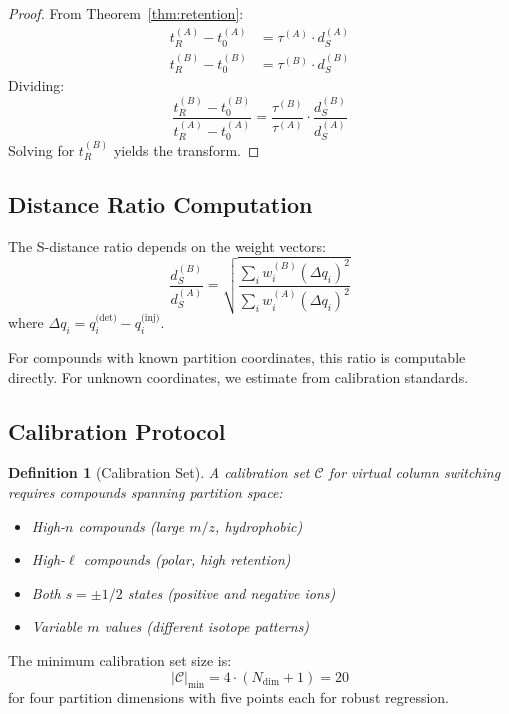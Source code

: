 \documentclass[twocolumn,10pt]{article}
\newtheorem{definition}[theorem]{Definition}
\begin{document}
\begin{proof}
From Theorem~\ref{thm:retention}:
\begin{align}
t_R^{(A)} - t_0^{(A)} &= \tau^{(A)} \cdot d_S^{(A)} \\
t_R^{(B)} - t_0^{(B)} &= \tau^{(B)} \cdot d_S^{(B)}
\end{align}
Dividing:
\begin{equation}
\frac{t_R^{(B)} - t_0^{(B)}}{t_R^{(A)} - t_0^{(A)}} = \frac{\tau^{(B)}}{\tau^{(A)}} \cdot \frac{d_S^{(B)}}{d_S^{(A)}}
\end{equation}
Solving for $t_R^{(B)}$ yields the transform.
\end{proof}

\subsection{Distance Ratio Computation}

The S-distance ratio depends on the weight vectors:
\begin{equation}
\frac{d_S^{(B)}}{d_S^{(A)}} = \sqrt{\frac{\sum_i w_i^{(B)} (\Delta q_i)^2}{\sum_i w_i^{(A)} (\Delta q_i)^2}}
\end{equation}
where $\Delta q_i = q_i^{\text{(det)}} - q_i^{\text{(inj)}}$.

For compounds with known partition coordinates, this ratio is computable directly. For unknown coordinates, we estimate from calibration standards.

\subsection{Calibration Protocol}

\begin{definition}[Calibration Set]
\label{def:calibration}
A calibration set $\mathcal{C}$ for virtual column switching requires compounds spanning partition space:
\begin{itemize}
    \item High-$n$ compounds (large $m/z$, hydrophobic)
    \item High-$\ell$ compounds (polar, high retention)
    \item Both $s = \pm 1/2$ states (positive and negative ions)
    \item Variable $m$ values (different isotope patterns)
\end{itemize}
\end{definition}

The minimum calibration set size is:
\begin{equation}
|\mathcal{C}|_{\min} = 4 \cdot (N_{\text{dim}} + 1) = 20
\end{equation}
for four partition dimensions with five points each for robust regression.
\end{document}
